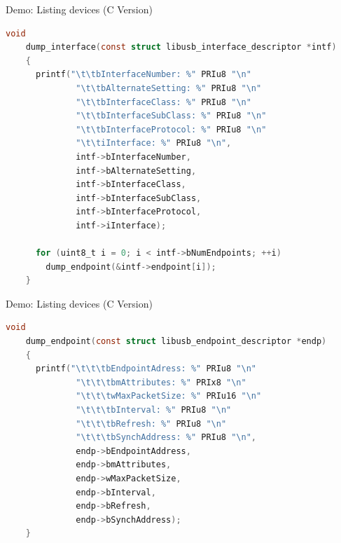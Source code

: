 \documentclass[pdf]{beamer}
\begin{document}
\begin{frame}[fragile]{Demo:  Listing devices (C Version)}
  \tiny
  \begin{lstlisting}[language=C]
    void
    dump_interface(const struct libusb_interface_descriptor *intf)
    {
      printf("\t\tbInterfaceNumber: %" PRIu8 "\n"
              "\t\tbAlternateSetting: %" PRIu8 "\n"
              "\t\tbInterfaceClass: %" PRIu8 "\n"
              "\t\tbInterfaceSubClass: %" PRIu8 "\n"
              "\t\tbInterfaceProtocol: %" PRIu8 "\n"
              "\t\tiInterface: %" PRIu8 "\n",
              intf->bInterfaceNumber,
              intf->bAlternateSetting,
              intf->bInterfaceClass,
              intf->bInterfaceSubClass,
              intf->bInterfaceProtocol,
              intf->iInterface);

      for (uint8_t i = 0; i < intf->bNumEndpoints; ++i)
        dump_endpoint(&intf->endpoint[i]);
    }
  \end{lstlisting}
\end{frame}

\begin{frame}[fragile]{Demo:  Listing devices (C Version)}
  \tiny
  \begin{lstlisting}[language=C]
    void
    dump_endpoint(const struct libusb_endpoint_descriptor *endp)
    {
      printf("\t\t\tbEndpointAdress: %" PRIu8 "\n"
              "\t\t\tbmAttributes: %" PRIx8 "\n"
              "\t\t\twMaxPacketSize: %" PRIu16 "\n"
              "\t\t\tbInterval: %" PRIu8 "\n"
              "\t\t\tbRefresh: %" PRIu8 "\n"
              "\t\t\tbSynchAddress: %" PRIu8 "\n",
              endp->bEndpointAddress,
              endp->bmAttributes,
              endp->wMaxPacketSize,
              endp->bInterval,
              endp->bRefresh,
              endp->bSynchAddress);
    }
  \end{lstlisting}
\end{frame}
\end{document}
